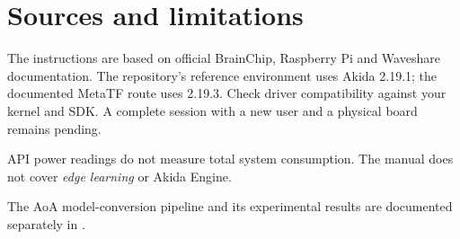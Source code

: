 \chapter{Sources and limitations}
\label{app:fuentes}

The instructions are based on official BrainChip, Raspberry Pi and Waveshare documentation.
The repository's reference environment uses Akida 2.19.1; the documented MetaTF route
uses 2.19.3. Check driver compatibility against your kernel and SDK.
A complete session with a new user and a physical board remains pending.

API power readings do not measure total system consumption.
The manual does not cover \emph{edge learning} or Akida Engine.

The AoA model-conversion pipeline and its experimental results are documented separately
in \href{https://github.com/AlvaroPRuiiz/akida-model-deployment-pipeline}{}.
